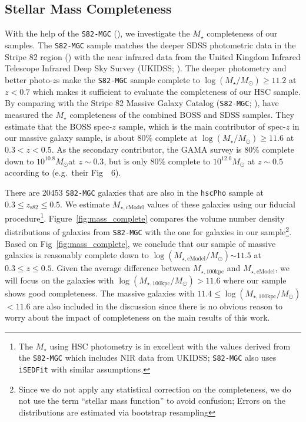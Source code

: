\documentclass[a4paper,fleqn,usenatbib]{mnras}
\def\msun{$M_\odot$}
\def\redm{\texttt{redMaPPer}}
\def\rbcg{\texttt{cenHighMh}}
\def\nbcg{\texttt{cenLowMh}}
\def\mstar{{$M_{\star}$}}
\def\logms{{$\log (M_{\star}/M_{\odot})$}}
\def\mtot{{$M_{\star,100\mathrm{kpc}}$}}
\def\mcmodel{{$M_{\star,\mathrm{cModel}}$}}
\def\logmtot{{$\log (M_{\star,100\mathrm{kpc}}/M_{\odot})$}}
\def\logmcmodel{{$\log (M_{\star,\mathrm{cModel}}/M_{\odot})$}}
\begin{document}
\subsection{Stellar Mass Completeness}
    \label{ssec:complete}
    
    With the help of the \texttt{S82-MGC} (\citealt{Bundy2015}), we investigate the 
    \mstar{} completeness of our samples. 
    The \texttt{S82-MGC} sample matches the deeper SDSS photometric data in the 
    Stripe 82 region (\citealt{Annis2014}) with the near infrared data from the United 
    Kingdom Infrared Telescope Infrared Deep Sky Survey (UKIDSS; 
    \citealt{Lawrence2007}). 
    The deeper photometry and better photo-$z$s make the \texttt{S82-MGC} sample 
    complete to \logms{}$\geq 11.2$ at $z<0.7$ which makes it sufficient to evaluate 
    the completeness of our HSC sample.   
	By comparing with the Stripe 82 Massive Galaxy Catalog
    (\texttt{S82-MGC}; \citealt{Bundy2015}), \citet{Leauthaud2016} have measured the
    \mstar{} completeness of the combined BOSS and SDSS samples. 
    They estimate that the BOSS spec-$z$ sample, which is the main contributor of 
    spec-$z$ in our massive galaxy sample, is about 80\% complete at 
    \logms{}$\geq 11.6$ at $0.3 < z < 0.5$. 
    As the secondary contributor, the GAMA survey is 80\% complete down to 
    $10^{10.8}$\msun at $z{\sim} 0.3$, but is only 80\% complete to 
    $10^{12.0}$\msun{} at $z{\sim} 0.5$ according to \citet{Taylor2011} (e.g.\ 
    their Fig~~6).
    
    There are 20453 \texttt{S82-MGC} galaxies that are also in the \texttt{hscPho} 
    sample at $0.3 \leq z_{\mathrm{s82}} \leq 0.5$. 
    We estimate \mcmodel{} values of these galaxies using our fiducial 
    procedure\footnote{The \mstar{} using HSC photometry is in excellent with the 
    values derived from the \texttt{S82-MGC} which includes NIR data from UKIDSS; 
    \texttt{S82-MGC} also uses \texttt{iSEDFit} with similar assumptions.}. 
    Figure~\ref{fig:mass_complete} compares the volume number density distributions 
    of galaxies from \texttt{S82-MGC} with the one for galaxies in our 
    sample\footnote{Since we do not apply any statistical correction on the 
    completeness, we do not use the term ``stellar mass function'' to avoid confusion;
    Errors on the distributions are estimated via bootstrap resampling}. 
    Based on Fig~\ref{fig:mass_complete}, we conclude that our sample of massive 
    galaxies is reasonably complete down to \logmcmodel{}${\sim} 11.5$ at 
    $0.3 \leq z \leq 0.5$. 
    Given the average difference between \mtot{} and \mcmodel{}, we will focus on 
    the galaxies with \logmtot{}$> 11.6$ where our sample shows good completeness.
    The massive galaxies with $11.4 \le$\logmtot{}$<11.6$ are also included in the 
    discussion since there is no obvious reason to worry about the impact of
    completeness on the main results of this work.
    
\end{document}
